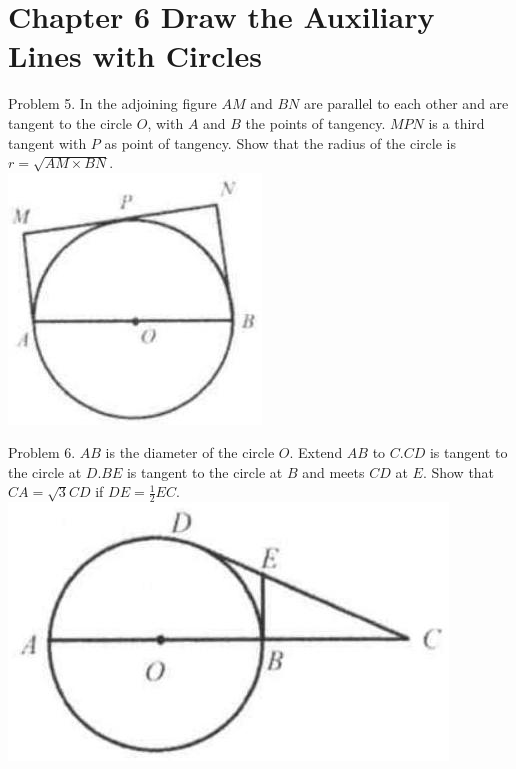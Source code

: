 \documentclass[10pt]{article}
\begin{document}
\section*{Chapter 6 Draw the Auxiliary Lines with Circles}
Problem 5. In the adjoining figure \(A M\) and \(B N\) are parallel to each other and are tangent to the circle \(O\), with \(A\) and \(B\) the points of tangency. \(M P N\) is a third tangent with \(P\) as point of tangency. Show that the radius of the circle is \(r=\sqrt{A M \times B N}\).\\
\includegraphics[max width=\textwidth, center]{2025_04_17_97bc1f7e44d93c271a88g-155(1)}

Problem 6. \(A B\) is the diameter of the circle \(O\). Extend \(A B\) to \(C . C D\) is tangent to the circle at \(D . B E\) is tangent to the circle at \(B\) and meets \(C D\) at \(E\). Show that \(C A=\sqrt{3} C D\) if \(D E=\frac{1}{2} E C\).\\
\includegraphics[max width=\textwidth, center]{2025_04_17_97bc1f7e44d93c271a88g-155(2)}
\end{document}
